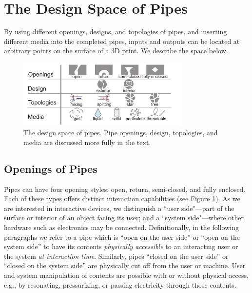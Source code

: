 \section{The Design Space of Pipes}
By using different openings, designs, and topologies of pipes, and inserting different media into the completed pipes, inputs and outputs can be located at arbitrary points on the surface of a 3D print.  We describe the space below.

\begin{figure}[h!]
\centering
    \includegraphics[width=3.4in]{figures/tubespace.pdf}
\caption{The design space of pipes.  Pipe openings, design, topologies, and media are discussed more fully in the text.}
\label{fig:pipespace}
\end{figure}

\subsection{Openings of Pipes}

Pipes can have four opening styles: open, return, semi-closed, and fully enclosed.  Each of these types offers distinct interaction capabilities (see Figure \ref{fig:pipespace}).  As we are interested in interactive devices, we distinguish a ``user side"---part of the surface or interior of an object facing its user; and a ``system side"---where other hardware such as electronics may be connected.  Definitionally, in the following paragraphs we refer to a pipe which is ``open on the user side'' or ``open on the system side'' to have its contents \emph{physically accessible} to an interacting user or the system \emph{at interaction time}.  Similarly, pipes ``closed on the user side'' or ``closed on the system side'' are physically cut off from the user or machine.  User and system manipulation of contents are possible with or without physical access, e.g., by resonating, pressurizing, or passing electricity through those contents.

